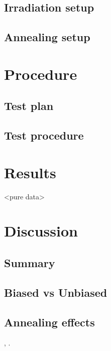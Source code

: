 \documentclass{article}
\begin{document}
\subsection{Irradiation setup}
\subsection{Annealing setup}

\section{Procedure}
\subsection{Test plan}
\subsection{Test procedure}

\section{Results}
<pure data>

\section{Discussion}
\subsection{Summary}
\subsection{Biased vs Unbiased}
\subsection{Annealing effects}

\textcite{einstein1905},
\parencite{knuth1984}.
\printbibliography
\end{document}
